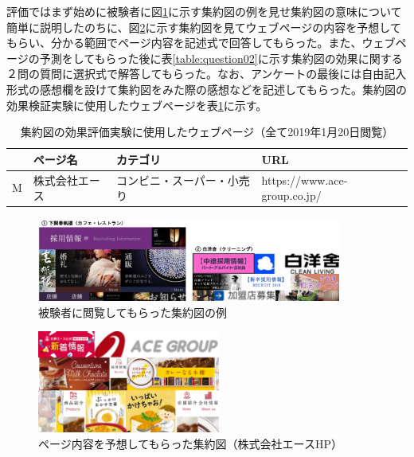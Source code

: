 \par 評価ではまず始めに被験者に図\ref{fig_experience03-2}に示す集約図の例を見せ集約図の意味について簡単に説明したのちに、図\ref{fig_experience03-1}に示す集約図を見てウェブページの内容を予想してもらい、分かる範囲でページ内容を記述式で回答してもらった。また、ウェブページの予測をしてもらった後に表\ref{table:question02}に示す集約図の効果に関する２問の質問に選択式で解答してもらった。なお、アンケートの最後には自由記入形式の感想欄を設けて集約図をみた際の感想などを記述してもらった。集約図の効果検証実験に使用したウェブページを表\ref{table:webpage-list3}に示す。

\begin{table}[h]
    \caption{集約図の効果評価実験に使用したウェブページ（全て2019年1月20日閲覧）}
    \label{table:webpage-list3}
    \centering
    \begingroup
    \renewcommand{\arraystretch}{1.2} %
    \small
      \begin{tabular}{llll}
      \hline
      & ページ名 & カテゴリ & URL \\
      \hline \hline
      M & 株式会社エース & コンビニ・スーパー・小売り & https://www.ace-group.co.jp/ \\
      \hline
    \end{tabular}
    \endgroup
\end{table}

\begin{figure}[H]
    \centering
    \includegraphics[width=10cm]{figures/experience03-2.png}
    \caption{被験者に閲覧してもらった集約図の例}
    \label{fig_experience03-2}
\end{figure}

\begin{figure}[H]
    \centering
    \includegraphics[width=6cm]{figures/experience03-1.png}
    \caption{ページ内容を予想してもらった集約図（株式会社エースHP）}
    \label{fig_experience03-1}
\end{figure}

